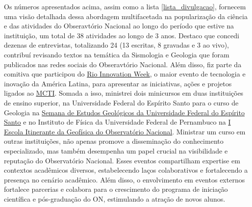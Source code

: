 \documentclass[10pt,a4paper,oneside]{book}
\begin{document}
Os números apresentados acima, assim como a lista \ref{lista_divulgacao}, fornecem uma visão detalhada dessa abordagem multifacetada na popularização da ciência e das atividades do Obseravtório Nacional ao longo do período que estive na instituição, um total de 38 atividades ao longo de 3 anos. Destaco que concedi dezenas de entrevistas, totalizando 24 (13 escritas, 8 gravadas e 3 ao vivo), contribuí revisando textos na temática da Sismologia e Geologia que foram publicados nas redes sociais do Obseravtório Nacional. Além disso, fiz parte da comitiva que participou do \href{https://www.gov.br/observatorio/pt-br/assuntos/areas-de-atuacao/divulgacao-e-popularizacao-da-ciencia/on-riw}{Rio Innovation Week}, o maior evento de tecnologia e inovação da América Latina, para apresentar as iniciativas, ações e projetos ligados ao \href{https://www.gov.br/mcti/pt-br}{MCTI}. Somada a isso, ministrei dois minicursos em duas instituições de ensino superior, na Universidade Federal do Espírito Santo para o curso de Geologia na \href{https://www.instagram.com/segeo.ufes/}{Semana de Estudos Geológicos da Universidade Federal do Espírito Santo} e no Instituto de Física da Universidade Federal de Pernambuco na \href{https://www.gov.br/observatorio/pt-br/assuntos/noticias/i-escola-itinerante-da-geofisica-do-observatorio-nacional-e-realizada-na-ufpe}{I Escola Itinerante da Geofísica do Observatório Nacional}. Ministrar um curso em outras instituições, não apenas promove a disseminação do conhecimento especializado, mas também desempenha um papel crucial na visibilidade e reputação do Observatório Nacional. Esses eventos compartilham expertise em contextos acadêmicos diversos, estabelecendo laços colaborativos e fortalecendo a presença no cenário acadêmico. Além disso, o envolvimento em eventos externos fortalece parcerias e colabora para o crescimento do programa de iniciação científica e pós-graduação do ON, estimulando a atração de novos alunos.
\end{document}
